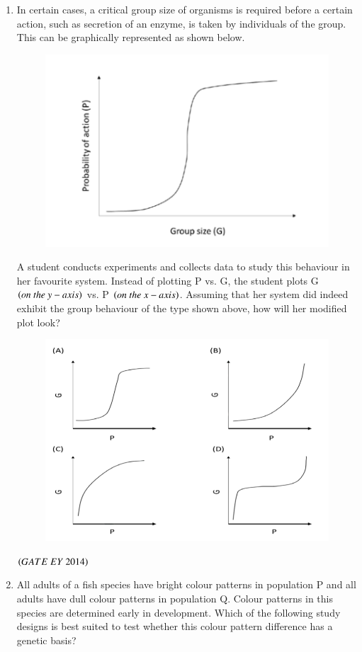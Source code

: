 \documentclass[journal]{IEEEtran}
\numberwithin{equation}{enumi}
\numberwithin{figure}{enumi}
\begin{document}
\begin{enumerate}
    \item  In certain cases, a critical group size of organisms is required before a certain action, such as secretion of an enzyme, is taken by individuals of the group. This can be graphically represented as shown below.
    \begin{figure}[H]
    \centering
    \includegraphics[width=0.5\columnwidth]{figs/7.png}
    \caption{}
    \label{fig:7}
   \end{figure}
    A student conducts experiments and collects data to study this behaviour in her favourite system. Instead of plotting P vs. G, the student plots G $\brak{on\ the\ y-axis}$ vs. P $\brak{on\ the\ x-axis}$. Assuming that her system did indeed exhibit the group behaviour of the type shown above, how will her modified plot look?
   \begin{figure}[H]
    \centering
    \includegraphics[width=0.7\columnwidth]{figs/8.png}
    \caption{}
    \label{fig:8}
   \end{figure}
    \hfill{$\brak{ GATE\ EY\ 2014}$}
    \bigskip
 \item All adults of a fish species have bright colour patterns in population P and all adults have dull colour patterns in population Q. Colour patterns in this species are determined early in development. Which of the following study designs is best suited to test whether this colour pattern difference has a genetic basis?
    \begin{enumerate}

\end{enumerate}
\end{enumerate}
\end{document}
